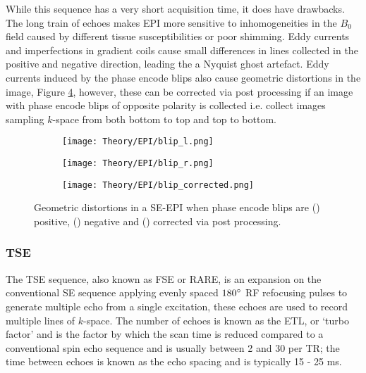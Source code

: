 While this sequence has a very short acquisition time, it does have drawbacks. The long train of echoes makes \ac{EPI} more sensitive to inhomogeneities in the $B_0$ field caused by different tissue susceptibilities or poor shimming. Eddy currents and imperfections in gradient coils cause small differences in lines collected in the positive and negative direction, leading the a Nyquist ghost artefact. Eddy currents induced by the phase encode blips also cause geometric distortions in the image, Figure \ref{fig:theory_epi_eddy}, however, these can be corrected via post processing if an image with phase encode blips of opposite polarity is collected i.e. collect images sampling $k$-space from both bottom to top and top to bottom.

\begin{figure}[H]
	\centering
	\begin{subfigure}[c]{0.30\textwidth}
		\centering
		\texttt{[image: Theory/EPI/blip\_l.png]}
		\caption{}
		\label{fig:theory_epi_blip_l}
	\end{subfigure}
	\hfill
	\begin{subfigure}[c]{0.30\textwidth}
		\centering
		\texttt{[image: Theory/EPI/blip\_r.png]}
		\caption{}
		\label{fig:theory_epi_blip_r}
	\end{subfigure}
	\hfill	
	\begin{subfigure}[c]{0.30\textwidth}
		\centering
		\texttt{[image: Theory/EPI/blip\_corrected.png]}
		\caption{}
		\label{fig:theory_epi_blip_corrected}
	\end{subfigure}
	\caption{Geometric distortions in a \ac{SE}-\ac{EPI} when phase encode blips are () positive, () negative and () corrected via post processing.}
	\label{fig:theory_epi_eddy}
\end{figure}


\subsubsection{\ac*{TSE}}
The \ac{TSE} sequence, also known as \ac{FSE} or \ac{RARE}, is an expansion on the conventional \ac{SE} sequence applying evenly spaced $180\degree${ }\ac{RF} refocusing pulses to generate multiple echo from a single excitation, these echoes are used to record multiple lines of $k$-space. The number of echoes is known as the \ac{ETL}, or `turbo factor' and is the factor by which the scan time is reduced compared to a conventional spin echo sequence and is usually between 2 and 30 per \ac{TR}; the time between echoes is known as the echo spacing and is typically 15 - 25 ms.

